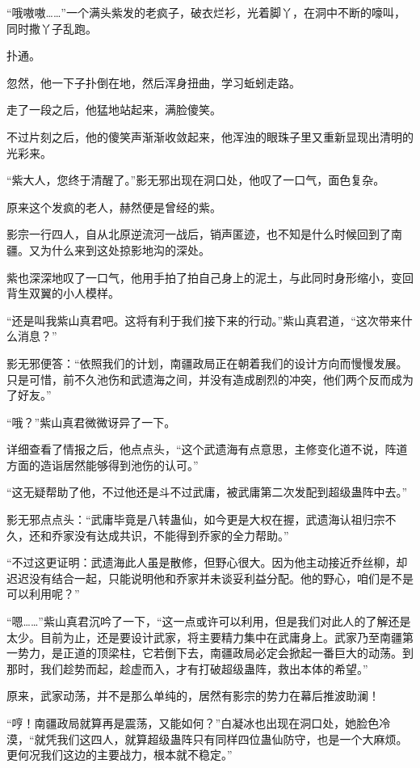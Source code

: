 \begin{this_body}
“哦嗷嗷……”一个满头紫发的老疯子，破衣烂衫，光着脚丫，在洞中不断的嚎叫，同时撒丫子乱跑。

扑通。

忽然，他一下子扑倒在地，然后浑身扭曲，学习蚯蚓走路。

走了一段之后，他猛地站起来，满脸傻笑。

不过片刻之后，他的傻笑声渐渐收敛起来，他浑浊的眼珠子里又重新显现出清明的光彩来。

“紫大人，您终于清醒了。”影无邪出现在洞口处，他叹了一口气，面色复杂。

原来这个发疯的老人，赫然便是曾经的紫。

影宗一行四人，自从北原逆流河一战后，销声匿迹，也不知是什么时候回到了南疆。又为什么来到这处掠影地沟的深处。

紫也深深地叹了一口气，他用手拍了拍自己身上的泥土，与此同时身形缩小，变回背生双翼的小人模样。

“还是叫我紫山真君吧。这将有利于我们接下来的行动。”紫山真君道，“这次带来什么消息？”

影无邪便答：“依照我们的计划，南疆政局正在朝着我们的设计方向而慢慢发展。只是可惜，前不久池伤和武遗海之间，并没有造成剧烈的冲突，他们两个反而成为了好友。”

“哦？”紫山真君微微讶异了一下。

详细查看了情报之后，他点点头，“这个武遗海有点意思，主修变化道不说，阵道方面的造诣居然能够得到池伤的认可。”

“这无疑帮助了他，不过他还是斗不过武庸，被武庸第二次发配到超级蛊阵中去。”

影无邪点点头：“武庸毕竟是八转蛊仙，如今更是大权在握，武遗海认祖归宗不久，还和乔家没有达成共识，不能得到乔家的全力帮助。”

“不过这更证明：武遗海此人虽是散修，但野心很大。因为他主动接近乔丝柳，却迟迟没有结合一起，只能说明他和乔家并未谈妥利益分配。他的野心，咱们是不是可以利用呢？”

“嗯……”紫山真君沉吟了一下，“这一点或许可以利用，但是我们对此人的了解还是太少。目前为止，还是要设计武家，将主要精力集中在武庸身上。武家乃至南疆第一势力，是正道的顶梁柱，它若倒下去，南疆政局必定会掀起一番巨大的动荡。到那时，我们趁势而起，趁虚而入，才有打破超级蛊阵，救出本体的希望。”

原来，武家动荡，并不是那么单纯的，居然有影宗的势力在幕后推波助澜！

“哼！南疆政局就算再是震荡，又能如何？”白凝冰也出现在洞口处，她脸色冷漠，“就凭我们这四人，就算超级蛊阵只有同样四位蛊仙防守，也是一个大麻烦。更何况我们这边的主要战力，根本就不稳定。”


\end{this_body}
